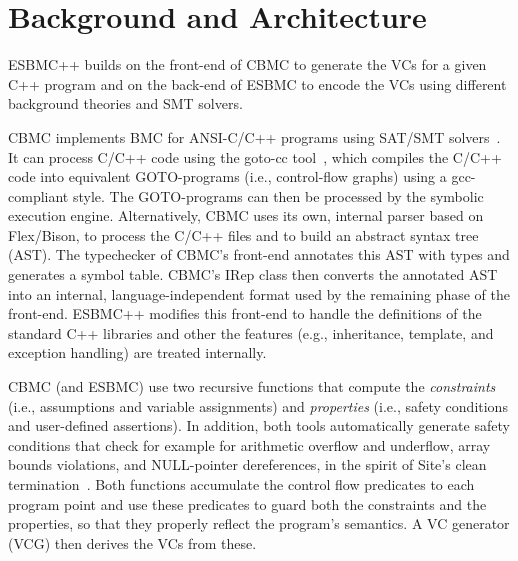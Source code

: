 \documentclass[a4paper]{llncs}
\begin{document}
\section{Background and Architecture}

ESBMC++ builds on the front-end of CBMC to generate the VCs for a given C++ program
and on the back-end of ESBMC to encode the VCs using different background theories
and SMT solvers. 

\smallskip{}
%
CBMC implements BMC for ANSI-C/C++ programs using SAT/SMT
solvers~\cite{Clarke04}.  It can process C/C++ code using the goto-cc
tool~\cite{Wintersteiger09}, which compiles the C/C++ code into
equivalent GOTO-programs (i.e., control-flow graphs) using a
gcc-compliant style. The GOTO-programs can then be processed by the
symbolic execution engine. Alternatively, CBMC uses its own, internal
parser based on Flex/Bison, to process the C/C++ files and to build an
abstract syntax tree (AST). The typechecker of CBMC's front-end
annotates this AST with types and generates a symbol table. CBMC's IRep
class then converts the annotated AST into an internal,
language-independent format used by the remaining phase of the
front-end.  ESBMC++ modifies this front-end to handle the definitions of
the standard C++ libraries and other the features (e.g., inheritance,
template, and exception handling) are treated internally.

CBMC (and ESBMC) use two recursive functions that compute the
\emph{constraints} (i.e., assumptions and variable assignments) and
\emph{properties} (i.e., safety conditions and user-defined
assertions). In addition, both tools automatically generate safety conditions
that check for example for arithmetic overflow and underflow, array bounds
violations, and NULL-pointer dereferences, in the spirit of Site's clean
termination~\cite{Sites74}. Both functions accumulate the control flow
predicates to each program point and use these predicates to guard both
the constraints and the properties, so that they properly reflect the
program's semantics. A VC generator (VCG) then derives the VCs from
these.
\end{document}
